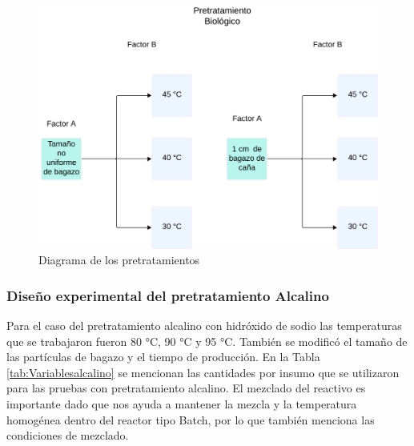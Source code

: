 \documentclass[12pt]{article}
\begin{document}
		\begin{figure} [h!]
			\centering
			\includegraphics[width=0.7\linewidth]{imagenes/diagramabiologico}
			\caption{Diagrama de los pretratamientos}
			\label{Diagrama biologico}
		\end{figure}
		
		
		
		
		
	
		
	\subsubsection{ Diseño experimental del pretratamiento Alcalino}
	\label{Diseño factorial del pretratamiento alcalino}

Para el caso del pretratamiento alcalino con hidróxido de sodio las temperaturas que se trabajaron fueron 80 °C, 90 °C y 95 °C. También se modificó el tamaño de las partículas de bagazo y el tiempo de producción. En la Tabla \ref{tab:Variablesalcalino} se mencionan las cantidades por insumo que se utilizaron para las pruebas con pretratamiento alcalino. El mezclado del reactivo es importante dado que nos ayuda a mantener la mezcla y la temperatura homogénea dentro del reactor tipo Batch, por lo que también menciona las condiciones de mezclado.
\end{document}
